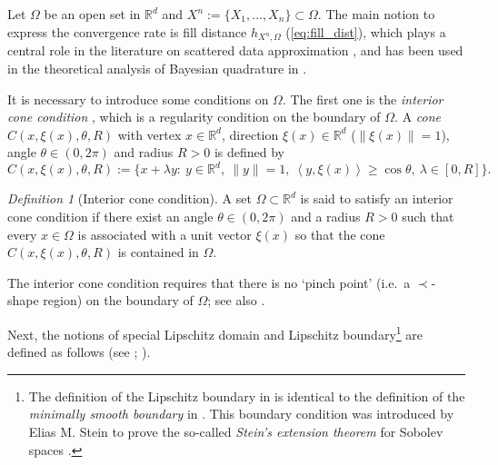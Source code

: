 \documentclass[11pt]{article}
\theoremstyle{remark}
\theoremstyle{example}
\newtheorem{definition}[theorem]{Definition}
\theoremstyle{remark}
\newcommand{\R}{\mathbb{R}}
\newcommand{\citep}{\cite}
\newcommand{\citealp}{\cite}
\begin{document}
Let $\Omega$ be an open set in $\R^d$ and $X^n := \{ X_1,\dots, X_n\}\subset\Omega$. %
The main notion to express the convergence rate is fill distance $h_{X^n,\Omega}$ (\ref{eq:fill_dist}), 
which plays a central role in the literature on scattered data approximation \citep{Wen05}, and has been used in the theoretical analysis of Bayesian quadrature in \cite{BriOatGirOsbSej15,OatCocBriGir16}.

It is necessary to introduce some conditions on $\Omega$.  The first one is the {\em interior cone condition} \cite[Definition 3.6]{Wen05}, which is a regularity condition on the boundary of $\Omega$.
A {\em cone} $C(x, \xi(x), \theta, R)$ with vertex $x \in \R^d$, direction $\xi(x) \in \R^d$ ($\| \xi(x) \| = 1$), angle $\theta \in (0,2\pi)$ and radius $R > 0$ is defined by
$$C(x, \xi(x), \theta, R) := \{ x + \lambda y:\ y \in \R^d,\ \|y\| = 1,\ \left<y, \xi(x) \right> \geq \cos \theta,\ \lambda \in [0,R] \}.$$
\vspace{-5mm}
\begin{definition}[Interior cone condition] \label{def:interior_cone}
A set $\Omega \subset \R^d$ is said to satisfy an interior cone condition if 
there exist an angle $\theta \in (0,2\pi)$ and a radius $R > 0$ such that every $x \in \Omega$ is associated with a unit vector $\xi(x)$ so that the cone $C(x, \xi(x), \theta, R)$ is contained in $\Omega$.
\end{definition}%
The interior cone condition requires that there is no `pinch point' (i.e.~a $\prec$-shape region) on the boundary of $\Omega$; see also \cite{OatCocBriGir16}. 

Next, the notions of special Lipschitz domain \cite[p.181]{Ste70} and Lipschitz boundary\footnote{The definition of the Lipschitz boundary in \cite{BreSco08} is identical to the definition of the {\em minimally smooth boundary} in \citep[p.189]{Ste70}. This boundary condition was introduced by Elias M. Stein to prove the so-called {\em Stein's extension theorem} for Sobolev spaces \citep[p.181]{Ste70}.} are defined as follows (see \citealp[p.189]{Ste70}; \citealp[Definition 1.4.4]{BreSco08}). 
\end{document}
